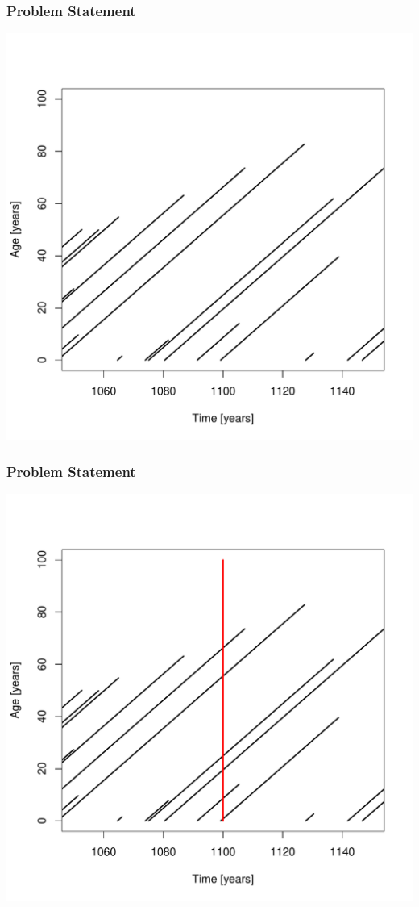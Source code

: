 \documentclass{beamer}
\begin{document}
\begin{frame}
  \frametitle{Problem Statement}
    \begin{center}
      \includegraphics[height=.85\textheight]{lifeline_plot_no_horiz_line.pdf}
    \end{center}
\end{frame}

\begin{frame}
  \frametitle{Problem Statement}
    \begin{center}
      \includegraphics[height=.85\textheight]{lifeline_plot.pdf}
    \end{center}
\end{frame}
\end{document}
